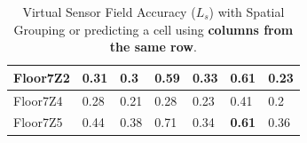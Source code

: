 \begin{table}[]
\begin{tabular}{|l|l|l|l|l|l|l|}
Floor7Z2 & 0.31                         & 0.3                             & 0.59                          & 0.33                             & 0.61                          & 0.23                     \\ \hline
Floor7Z4 & 0.28                         & 0.21                            & 0.28                          & 0.23                             & 0.41                          & 0.2                      \\ \hline
Floor7Z5 & 0.44                         & 0.38                            & 0.71                          & 0.34                             & \textbf{0.61  }                        & 0.36                     \\ \hline

\end{tabular}
\caption{Virtual Sensor Field Accuracy ($L_s$) with Spatial Grouping or predicting a cell using \textbf{columns from the same row}.}
\label{table:vsfAccuracySpatial}
\end{table}

